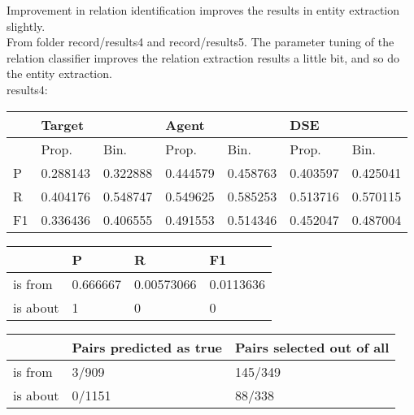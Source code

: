 \documentclass[a4paper, 12pt]{article}
\begin{document}
Improvement in relation identification improves the results in entity 
extraction slightly.\\
From folder record/results4 and record/results5.
The parameter tuning of the relation classifier improves the relation
extraction results a little bit, and so do the entity extraction.\\

results4:\\
\begin{table}[h!]
\centering
\begin{tabular}{l|ll|ll|ll}
\hline
   & \multicolumn{2}{l}{Target} & \multicolumn{2}{l}{Agent} & \multicolumn{2}{l}{DSE} \\ \hline
   & Prop.& Bin.& Prop.& Bin.& Prop.& Bin.\\
 \hline
P  &0.288143&0.322888& 0.444579 & 0.458763 &0.403597 & 0.425041  \\
R  &0.404176&0.548747& 0.549625 & 0.585253 &0.513716 & 0.570115  \\
F1 &0.336436&0.406555& 0.491553 & 0.514346 &0.452047 & 0.487004  \\ \hline
\end{tabular}
\centering
\begin{tabular}{l|l|l|l}
\hline
         & P & R & F1    \\\hline
is from  & 0.666667& 0.00573066&  0.0113636\\
is about & 1& 0& 0\\
\hline
\end{tabular}
\begin{tabular}{l|l|l}
\hline
         & Pairs predicted as true & Pairs selected out of all\\\hline
is from  & 3/909& 145/349 \\
is about & 0/1151& 88/338\\
\hline
\end{tabular}
\end{table}
\end{document}

